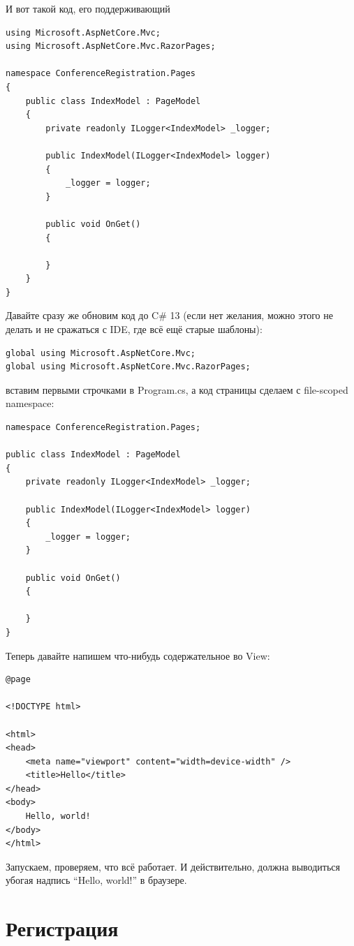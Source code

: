 \documentclass{../../text-style}
\begin{document}
И вот такой код, его поддерживающий

\begin{verbatim}
using Microsoft.AspNetCore.Mvc;
using Microsoft.AspNetCore.Mvc.RazorPages;

namespace ConferenceRegistration.Pages
{
    public class IndexModel : PageModel
    {
        private readonly ILogger<IndexModel> _logger;

        public IndexModel(ILogger<IndexModel> logger)
        {
            _logger = logger;
        }
    
        public void OnGet()
        {
    
        }
    }
}
\end{verbatim}

Давайте сразу же обновим код до C\# 13 (если нет желания, можно этого не делать и не сражаться с IDE, где всё ещё старые шаблоны):

\begin{verbatim}
global using Microsoft.AspNetCore.Mvc;
global using Microsoft.AspNetCore.Mvc.RazorPages;
\end{verbatim}

вставим первыми строчками в Program.cs, а код страницы сделаем с file-scoped namespace:

\begin{verbatim}
namespace ConferenceRegistration.Pages;

public class IndexModel : PageModel
{
    private readonly ILogger<IndexModel> _logger;

    public IndexModel(ILogger<IndexModel> logger)
    {
        _logger = logger;
    }

    public void OnGet()
    {

    }
}
\end{verbatim}

Теперь давайте напишем что-нибудь содержательное во View:

\begin{verbatim}
@page

<!DOCTYPE html>

<html>
<head>
    <meta name="viewport" content="width=device-width" />
    <title>Hello</title>
</head>
<body>
    Hello, world!
</body>
</html>
\end{verbatim}

Запускаем, проверяем, что всё работает. И действительно, должна выводиться убогая надпись \enquote{Hello, world!} в браузере.

\section{Регистрация}
\end{document}
